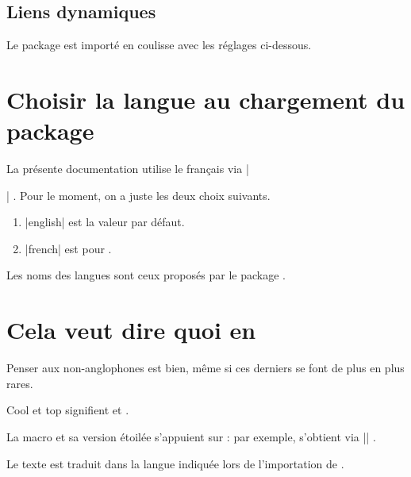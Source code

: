 \subsection{Liens dynamiques}

Le package  est importé en coulisse avec les réglages ci-dessous.


\begin{tdoclatex}[code]
\hypersetup{
  colorlinks,
  citecolor = orange!75!black,
  filecolor = orange!75!black,
  linkcolor = orange!75!black,
  urlcolor  = orange!75!black
}
\end{tdoclatex}


\section{Choisir la langue au chargement du package}

La présente documentation utilise le français via \tdocinlatex|\usepackage[lang = french]{tutodoc}| .
Pour le moment, on a juste les deux choix suivants.

\begin{enumerate}
    \item \tdocinlatex|english| est la valeur par défaut.

    \item \tdocinlatex|french| est pour .
\end{enumerate}


\begin{tdocnote}
    Les noms des langues sont ceux proposés par le package .
\end{tdocnote}


\section{Cela veut dire quoi en }

Penser aux non-anglophones est bien, même si ces derniers se font de plus en plus rares.


\begin{tdoclatex}
Cool et top signifient  et .
\end{tdoclatex}


La macro  et sa version étoilée s'appuient sur  : par exemple,  s'obtient via \tdocinlatex|| .


\begin{tdocnote}
    Le texte  est traduit dans la langue indiquée lors de l'importation de .
\end{tdocnote}


